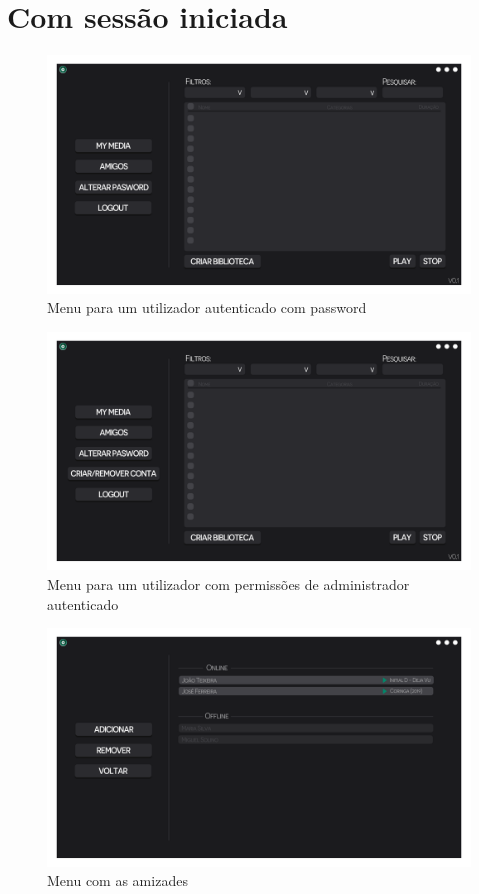 \documentclass[a4paper]{report}
\begin{document}
\section{Com sessão iniciada}

\begin{figure}[H]
	\centering 
    \includegraphics[width=\textwidth]{images/Principal_Menu.png}  
    \caption{Menu para um utilizador autenticado com password}
\end{figure}

\begin{figure}[H]
	\centering 
    \includegraphics[width=\textwidth]{images/Principal_Admin_Menu.png}  
    \caption{Menu para um utilizador com permissões de administrador autenticado}
\end{figure}

\begin{figure}[H]
	\centering 
    \includegraphics[width=\textwidth]{images/Amigos_Menu.png}  
    \caption{Menu com as amizades}
\end{figure}
\end{document}
